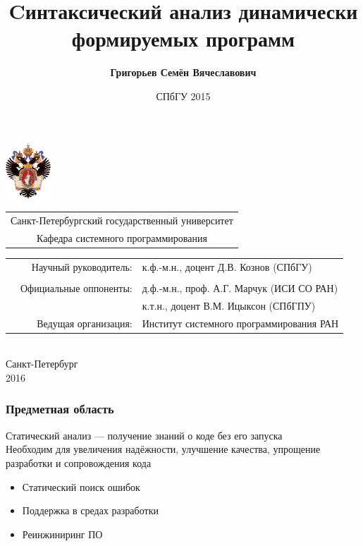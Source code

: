 \documentclass{beamer}
\title[]{Cинтаксический анализ динамически формируемых программ}
\author[Григорьев Семён]{{\bfseries Григорьев Семён Вячеславович}}
\begin{document}
{

\begin{frame}
\includegraphics[width=1.7cm]{SPbGU_Logo.png}
\vspace{-40pt}
\hspace{-10pt}
\begin{center}
   \begin{tabular}{c}
        \scriptsize{Санкт-Петербургский государственный университет} \\
        \scriptsize{Кафедра системного программирования}
    \end{tabular}

\titlepage
\vspace{-10pt}
{\scriptsize
 {
 \begin{tabular} {p{1.5cm} r l} 
  &{Научный руководитель:}  & к.ф.-м.н., доцент Д.В. Кознов (СПбГУ)\\ 
  & & \\
  &{Официальные оппоненты:} & д.ф.-м.н., проф.  А.Г. Марчук (ИСИ СО РАН)\\ 
  &                         & к.т.н., доцент В.М. Ицыксон (СПбГПУ)\\
  &{Ведущая организация:} &  Институт системного программирования РАН\\ 
 \end{tabular}
 }}
  \\
  \vspace{32pt}
  \scriptsize{Санкт-Петербург\\
                 2016}
  \end{center}
\end{frame}

\date{СПбГУ 2015}
}


\begin{frame}
    \transwipe[direction=90]
    \frametitle{Предметная область}
    Статический анализ --- получение знаний о коде без его запуска\\ \vspace{12pt}
    Необходим для увеличения надёжности, улучшение качества, упрощение разработки и сопровождения кода
    \begin{itemize}
        \item Статический поиск ошибок
        \item Поддержка в средах разработки
        \item Реинжиниринг ПО
    \end{itemize}
\end{frame}
\end{document}
